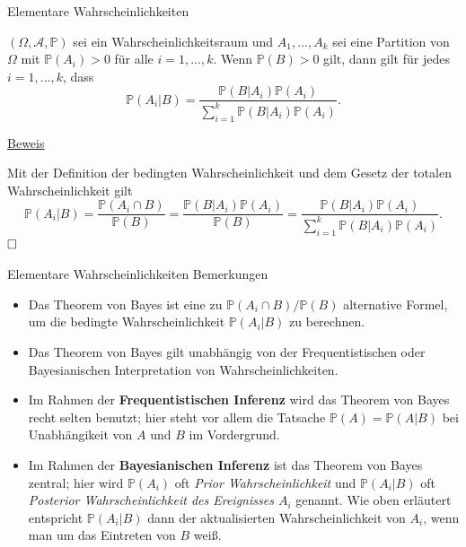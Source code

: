\documentclass[
  8pt,
  ignorenonframetext,
]{beamer}
\begin{document}
\begin{frame}{Elementare Wahrscheinlichkeiten}
\protect\hypertarget{elementare-wahrscheinlichkeiten-1}{}
\small
\begin{theorem}
\normalfont
\justifying
$(\Omega,\mathcal{A},\mathbb{P})$ sei ein Wahrscheinlichkeitsraum und $A_1, ...,A_k$ 
sei eine Partition von $\Omega$ mit $\mathbb{P}(A_i) > 0$ für alle $i = 1,...,k$.
Wenn $\mathbb{P}(B) > 0$ gilt, dann gilt für jedes $i = 1,...,k$, dass
\begin{equation}
\mathbb{P}(A_i|B)
= \frac{\mathbb{P}(B|A_i)\mathbb{P}(A_i)}{\sum_{i=1}^k \mathbb{P}(B|A_i)\mathbb{P}(A_i)}.
\end{equation}
\end{theorem}

\footnotesize

\underline{Beweis} \vspace{1mm}

Mit der Definition der bedingten Wahrscheinlichkeit und dem Gesetz der
totalen Wahrscheinlichkeit gilt \begin{equation}
\mathbb{P}(A_i|B)
= \frac{\mathbb{P}(A_i \cap B)}{\mathbb{P}(B)}
= \frac{\mathbb{P}(B|A_i)\mathbb{P}(A_i)}{\mathbb{P}(B)}
= \frac{\mathbb{P}(B|A_i)\mathbb{P}(A_i)}{\sum_{i=1}^k \mathbb{P}(B|A_i)\mathbb{P}(A_i)}.
\end{equation} \(\hfill \Box\)
\end{frame}

\begin{frame}{Elementare Wahrscheinlichkeiten}
\protect\hypertarget{elementare-wahrscheinlichkeiten-2}{}
Bemerkungen \small

\begin{itemize}
\itemsep2mm
\item Das Theorem von Bayes ist eine zu $\mathbb{P}(A_i \cap B)/ \mathbb{P}(B)$ 
alternative Formel, um die bedingte Wahrscheinlichkeit  $\mathbb{P}(A_i|B)$ zu berechnen.
\item Das Theorem von Bayes gilt unabhängig von der Frequentistischen oder 
Bayesianischen Interpretation von Wahrscheinlichkeiten.
\item Im Rahmen der \textbf{Frequentistischen Inferenz} wird das Theorem von Bayes 
recht selten benutzt; hier steht vor allem die Tatsache $\mathbb{P}(A) = \mathbb{P}(A|B)$ 
bei Unabhängikeit von $A$ und $B$ im Vordergrund.
\item Im Rahmen der \textbf{Bayesianischen Inferenz} ist das Theorem von Bayes 
zentral; hier wird $\mathbb{P}(A_i)$ oft \textit{Prior Wahrscheinlichkeit} 
und $\mathbb{P}(A_i|B)$ oft \textit{Posterior Wahrscheinlichkeit des Ereignisses $A_i$} 
genannt. Wie oben erläutert entspricht $\mathbb{P}(A_i|B)$ dann der aktualisierten 
Wahrscheinlichkeit von $A_i$, wenn man um das Eintreten von $B$ weiß.
\end{itemize}
\end{frame}
\end{document}
